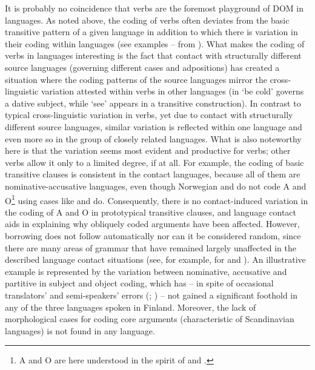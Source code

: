\documentclass[output=paper]{LSP/langsci}
\begin{document}
 It is probably no coincidence that  verbs are the foremost playground of DOM in  languages. As noted above, the coding of  verbs often deviates from the basic transitive pattern of a given language in addition to which there is variation in their coding within languages (see examples -- from ). What makes the coding of  verbs in  languages interesting is the fact that contact with structurally different source languages (governing different cases and adpositions) has created a situation where the coding patterns of the source languages mirror the cross-linguistic variation attested within verbs in other languages (\eg in  ‘be cold’ governs a dative subject, while ‘see’ appears in a transitive construction). In contrast to typical cross-linguistic variation in  verbs, yet due to contact with structurally different source languages, similar variation is reflected within one language and even more so in the group of closely related  languages. What is also noteworthy here is that the variation seems most evident and productive for  verbs; other verbs allow it only to a limited degree, if at all. For example, the coding of basic transitive clauses is consistent in the contact languages, because all of them are nominative-accusative languages, even though Norwegian and  do not code A and O\footnote{A and O are here understood in the spirit of \citet{Comrie1978Ergativity} and \citet{Dixon1979Ergativity}.} using cases like  and  do. Consequently, there is no contact-induced variation in the coding of A and O in prototypical transitive clauses, and language contact aids in explaining why obliquely coded arguments have been affected. However, borrowing does not follow automatically nor can it be considered random, since there are many areas of grammar that have remained largely unaffected in the described language contact situations (see, for example, \citealt{Riessler2007Grammatical} for  and ). An illustrative example is represented by the  variation between nominative, accusative and partitive in subject and object coding, which has – in spite of occasional translators’ and semi-speakers’ errors (\citealt[131]{Magga1987Samas}; \citealt[78–79]{Lansman2009Oahppiid}) – not gained a significant foothold in any of the three  languages spoken in Finland. Moreover, the lack of morphological cases for coding core arguments (characteristic of Scandinavian languages) is not found in any  language.
\end{document}
